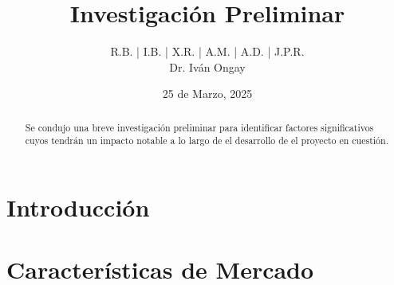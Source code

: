 \documentclass{article}
\title{\textbf{Investigación Preliminar}}
\author{R.B. | I.B. | X.R. | A.M. | A.D. | J.P.R. \\ Dr. Iván Ongay}
\date{25 de Marzo, 2025}
\begin{document}
\pagecolor{black}
\color{white}
\maketitle


\begin{abstract}
    Se condujo una breve investigación preliminar para identificar factores significativos cuyos tendrán un impacto notable a lo largo de el desarrollo de el proyecto en cuestión. 
\end{abstract}

\begin{Large}
\tableofcontents
\end{Large}%
\pagebreak

\section{Introducción} \label{sec:intro}


\section{Características de Mercado} \label{sec:caracmerc}



 
\end{document}
